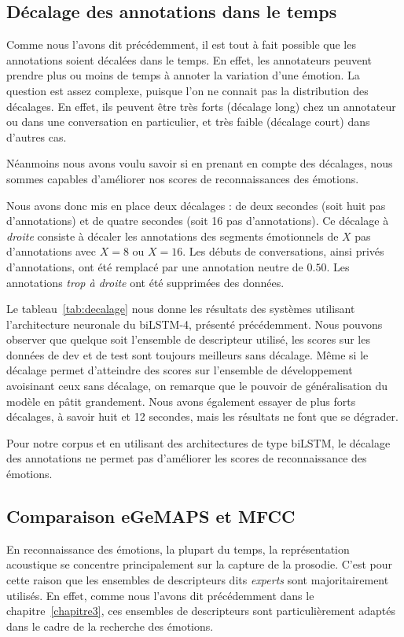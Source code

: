 

\subsection{Décalage des annotations dans le temps}
Comme nous l'avons dit précédemment, il est tout à fait possible que les annotations soient décalées dans le temps. En effet, les annotateurs peuvent prendre plus ou moins de temps à annoter la variation d'une émotion. La question est assez complexe, puisque l'on ne connait pas la distribution des décalages. En effet, ils peuvent être très forts (décalage long) chez un annotateur ou dans une conversation en particulier, et très faible (décalage court) dans d'autres cas.

Néanmoins nous avons voulu savoir si en prenant en compte des décalages, nous sommes capables d'améliorer nos scores de reconnaissances des émotions.

Nous avons donc mis en place deux décalages : de deux secondes (soit huit pas d'annotations) et de quatre secondes (soit 16 pas d'annotations). Ce décalage à \textit{droite} consiste à décaler les annotations des segments émotionnels de $X$ pas d'annotations avec $X=8$ ou $X=16$. Les débuts de conversations, ainsi privés d'annotations, ont été remplacé par une annotation neutre de $0.50$. Les annotations \textit{trop à droite} ont été supprimées des données.



Le tableau~\ref{tab:decalage} nous donne les résultats des systèmes utilisant l'architecture neuronale du biLSTM-4, présenté précédemment. Nous pouvons observer que quelque soit l'ensemble de descripteur utilisé, les scores sur les données de dev et de test sont toujours meilleurs sans décalage. Même si le décalage permet d'atteindre des scores sur l'ensemble de développement avoisinant ceux sans décalage, on remarque que le pouvoir de généralisation du modèle en pâtit grandement. Nous avons également essayer de plus forts décalages, à savoir huit et 12 secondes, mais les résultats ne font que se dégrader.

Pour notre corpus et en utilisant des architectures de type biLSTM, le décalage des annotations ne permet pas d'améliorer les scores de reconnaissance des émotions.

\subsection{Comparaison eGeMAPS et MFCC}
En reconnaissance des émotions, la plupart du temps, la représentation acoustique se concentre principalement sur la capture de la prosodie. C'est pour cette raison que les ensembles de descripteurs dits \textit{experts} sont majoritairement utilisés. En effet, comme nous l'avons dit précédemment dans le chapitre~\ref{chapitre3}, ces ensembles de descripteurs sont particulièrement adaptés dans le cadre de la recherche des émotions.

